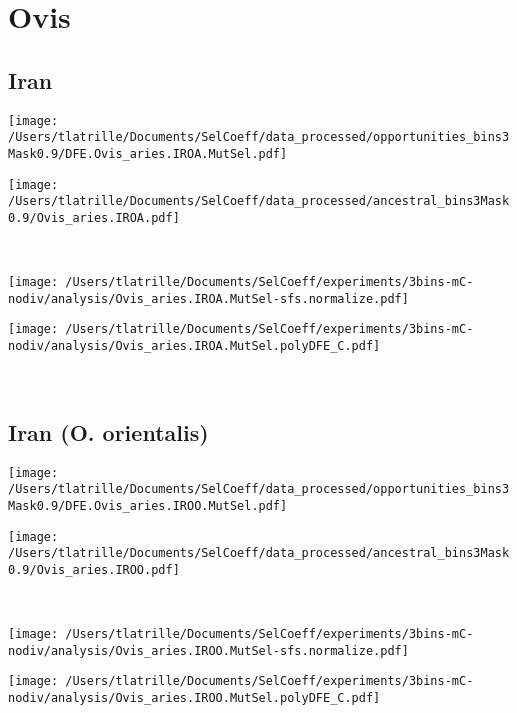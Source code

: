 \documentclass{article}
\begin{document}
    \section{Ovis}

    \subsection{Iran}

    \begin{minipage}{0.49\linewidth}
        \texttt{[image: /Users/tlatrille/Documents/SelCoeff/data\_processed/opportunities\_bins3Mask0.9/DFE.Ovis\_aries.IROA.MutSel.pdf]}
    \end{minipage}
    \begin{minipage}{0.49\linewidth}
        \texttt{[image: /Users/tlatrille/Documents/SelCoeff/data\_processed/ancestral\_bins3Mask0.9/Ovis\_aries.IROA.pdf]}
    \end{minipage}
    \\
    \begin{minipage}{0.49\linewidth}
        \texttt{[image: /Users/tlatrille/Documents/SelCoeff/experiments/3bins-mC-nodiv/analysis/Ovis\_aries.IROA.MutSel-sfs.normalize.pdf]}
    \end{minipage}
    \begin{minipage}{0.49\linewidth}
        \texttt{[image: /Users/tlatrille/Documents/SelCoeff/experiments/3bins-mC-nodiv/analysis/Ovis\_aries.IROA.MutSel.polyDFE\_C.pdf]}
    \end{minipage}
    \\
    \subsection{Iran (O. orientalis)}

    \begin{minipage}{0.49\linewidth}
        \texttt{[image: /Users/tlatrille/Documents/SelCoeff/data\_processed/opportunities\_bins3Mask0.9/DFE.Ovis\_aries.IROO.MutSel.pdf]}
    \end{minipage}
    \begin{minipage}{0.49\linewidth}
        \texttt{[image: /Users/tlatrille/Documents/SelCoeff/data\_processed/ancestral\_bins3Mask0.9/Ovis\_aries.IROO.pdf]}
    \end{minipage}
    \\
    \begin{minipage}{0.49\linewidth}
        \texttt{[image: /Users/tlatrille/Documents/SelCoeff/experiments/3bins-mC-nodiv/analysis/Ovis\_aries.IROO.MutSel-sfs.normalize.pdf]}
    \end{minipage}
    \begin{minipage}{0.49\linewidth}
        \texttt{[image: /Users/tlatrille/Documents/SelCoeff/experiments/3bins-mC-nodiv/analysis/Ovis\_aries.IROO.MutSel.polyDFE\_C.pdf]}
    \end{minipage}
    \\
\end{document}
